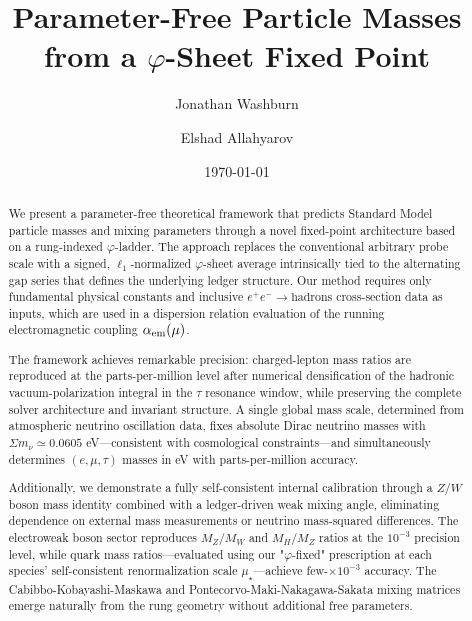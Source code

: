 \documentclass[%
amsmath,amssymb,
aps,
prb,
floatfix,
twocolumn
]{revtex4-2}
\begin{document}
\title{Parameter-Free Particle Masses from a $\varphi$-Sheet Fixed Point}

\author{Jonathan Washburn}

\author{Elshad Allahyarov}

\date{\today}

\begin{abstract}
We present a parameter-free theoretical framework that predicts Standard Model particle masses and mixing parameters through a novel fixed-point architecture based on a rung-indexed $\varphi$-ladder. The approach replaces the conventional arbitrary probe scale with a signed, $\ell_1$-normalized $\varphi$-sheet average intrinsically tied to the alternating gap series that defines the underlying ledger structure. Our method requires only fundamental physical constants and inclusive $e^+e^-\!\to\!\text{hadrons}$ cross-section data as inputs, which are used in a dispersion relation evaluation of the running electromagnetic coupling $\alpha_{\rm em}(\mu)$.

The framework achieves remarkable precision: charged-lepton mass ratios are reproduced at the parts-per-million level after numerical densification of the hadronic vacuum-polarization integral in the $\tau$ resonance window, while preserving the complete solver architecture and invariant structure. A single global mass scale, determined from atmospheric neutrino oscillation data, fixes absolute Dirac neutrino masses with $\Sigma m_\nu\simeq 0.0605$ eV—consistent with cosmological constraints—and simultaneously determines $(e,\mu,\tau)$ masses in eV with parts-per-million accuracy.

Additionally, we demonstrate a fully self-consistent internal calibration through a $Z/W$ boson mass identity combined with a ledger-driven weak mixing angle, eliminating dependence on external mass measurements or neutrino mass-squared differences. The electroweak boson sector reproduces $M_Z/M_W$ and $M_H/M_Z$ ratios at the $10^{-3}$ precision level, while quark mass ratios—evaluated using our "$\varphi$-fixed" prescription at each species' self-consistent renormalization scale $\mu_\star$—achieve few-$\times 10^{-3}$ accuracy. The Cabibbo-Kobayashi-Maskawa and Pontecorvo-Maki-Nakagawa-Sakata mixing matrices emerge naturally from the rung geometry without additional free parameters.


\end{abstract}
\end{document}

